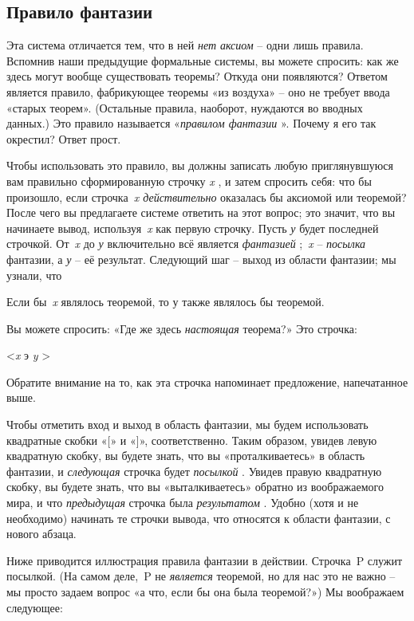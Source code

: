 \documentclass[../main.tex]{subfiles}
\begin{document}
\subsection{Правило фантазии}

Эта система отличается тем, что в ней \emph{нет аксиом} \--- одни лишь правила. Вспомнив наши предыдущие формальные системы, вы можете спросить: как же здесь могут вообще существовать теоремы? Откуда они появляются? Ответом является правило, фабрикующее теоремы «из воздуха» \--- оно не требует ввода «старых теорем». (Остальные правила, наоборот, нуждаются во вводных данных.) Это правило называется «\emph{правилом фантазии} ». Почему я его так окрестил? Ответ прост.

Чтобы использовать это правило, вы должны записать любую приглянувшуюся вам правильно сформированную строчку \emph{x} , и затем спросить себя: что бы произошло, если строчка~\emph{x действительно} оказалась бы аксиомой или теоремой? После чего вы предлагаете системе ответить на этот вопрос; это значит, что вы начинаете вывод, используя~\emph{x} как первую строчку. Пусть \emph{у} будет последней строчкой. От~\emph{x} до \emph{у} включительно всё является \emph{фантазией} ;~\emph{x} \--- \emph{посылка} фантазии, а \emph{у} \--- её результат. Следующий шаг \--- выход из области фантазии; мы узнали, что

Если бы~\emph{x} являлось теоремой, то у также являлось бы теоремой.

Вы можете спросить: «Где же здесь \emph{настоящая} теорема?» Это строчка:

\textless{}\emph{x} э \emph{y} \textgreater{}

Обратите внимание на то, как эта строчка напоминает предложение, напечатанное выше.

Чтобы отметить вход и выход в область фантазии, мы будем использовать квадратные скобки «{[}» и «{]}», соответственно. Таким образом, увидев левую квадратную скобку, вы будете знать, что вы «проталкиваетесь» в область фантазии, и \emph{следующая} строчка будет \emph{посылкой} . Увидев правую квадратную скобку, вы будете знать, что вы «выталкиваетесь» обратно из воображаемого мира, и что \emph{предыдущая} строчка была \emph{результатом} . Удобно (хотя и не необходимо) начинать те строчки вывода, что относятся к области фантазии, с нового абзаца.

Ниже приводится иллюстрация правила фантазии в действии. Строчка~P служит посылкой. (На самом деле,~P не \emph{является} теоремой, но для нас это не важно \--- мы просто задаем вопрос «а что, если бы она была теоремой?») Мы воображаем следующее:
\end{document}
